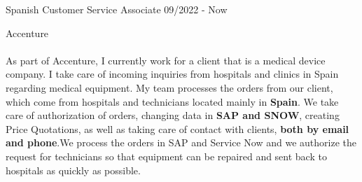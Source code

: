 \documentclass[11pt]{formatting/format} %
\begin{document}


\begin{entrylist}
	\entry
		{\color{text}}
		{\color{text} \Large Spanish Customer Service Associate  }
		{\color{text} \large 09/2022  - Now }
		{\color{text}  \large Accenture \\\\
 \normalsize As part of Accenture, I currently work for a client that is a medical device company. I take care of incoming inquiries from hospitals and clinics in Spain regarding medical equipment. My team processes the orders from our client, which come from hospitals and technicians located mainly in \textbf{Spain}. We take care of authorization of orders, changing data in \textbf{SAP and SNOW}, creating Price Quotations, as well as taking care of contact with clients, \textbf{both by email and phone}.We process the orders in SAP and Service Now and we authorize the request for technicians so that  equipment can be repaired and sent back to hospitals as quickly as possible. 
 
}
\end{entrylist}
\end{document}
